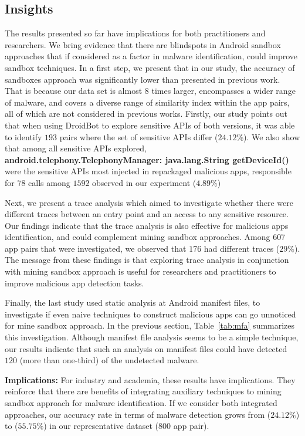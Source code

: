 \subsection{Insights}\label{sec:implications} 

The results presented so far have implications for both practitioners and researchers. We bring evidence that there are blindspots in Android sandbox approaches that if considered as a factor in malware identification, could improve sandbox techniques. In a first step, we present that in our study, the accuracy of sandboxes approach was significantly lower than presented in previous work. That is because our data set is almost $8$ times larger, encompasses a wider range of malware, and covers a diverse range of similarity index within the app pairs, all of which are not considered in previous works. Firstly, our study points out that when using DroidBot to explore sensitive APIs of both versions, it was able to identify $193$ pairs where the set of sensitive APIs differ ($24.12$\%). We also show that among all sensitive APIs explored, \textbf{android.telephony.TelephonyManager: java.lang.String getDeviceId()} were the sensitive APIs most injected in repackaged malicious apps, responsible for $78$ calls among $1592$ observed in our experiment ($4.89\%$)

Next, we present a trace analysis which aimed to investigate whether there were different traces between an entry point and an access to any sensitive resource. Our findings indicate that the trace analysis is also effective for malicious apps identification, and could complement mining sandbox approaches. Among $607$ app pairs that were investigated, we observed that $176$ had different traces ($29\%$). The message from these findings is that exploring trace analysis in conjunction with mining sandbox approach is useful for researchers and practitioners to improve malicious app detection tasks. 

Finally, the last study used static analysis at Android manifest files, to investigate if even naive techniques to construct malicious apps can go unnoticed for mine sandbox approach. In the previous section, Table~\ref{tab:mfa} summarizes this investigation. Although manifest file analysis seems to be a simple technique, our results indicate that such an analysis on manifest files could have detected $120$ (more than one-third) of the undetected malware.

\textbf{Implications: }For industry and academia, these results have implications. They reinforce that there are benefits of integrating auxiliary techniques to mining sandbox approach for malware identification. 
 If we consider both integrated approaches, our accuracy rate in terms of malware detection grows from ($24.12\%$) to ($55.75\%$) in our representative dataset ($800$ app pair). %

